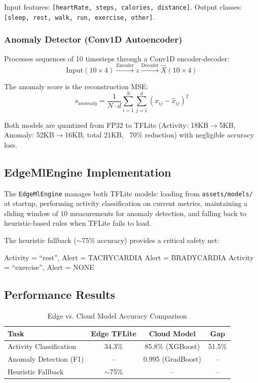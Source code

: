 \documentclass[conference]{IEEEtran}
\begin{document}
Input features: \texttt{[heartRate, steps, calories, distance]}. Output classes: \texttt{[sleep, rest, walk, run, exercise, other]}.

\subsubsection{Anomaly Detector (Conv1D Autoencoder)}
Processes sequences of 10 timesteps through a Conv1D encoder-decoder:
\begin{equation}
\text{Input}(10 \times 4) \xrightarrow{\text{Encoder}} z \xrightarrow{\text{Decoder}} \hat{X}(10 \times 4)
\end{equation}

The anomaly score is the reconstruction MSE:
\begin{equation}
s_{anomaly} = \frac{1}{N \cdot d} \sum_{i=1}^{N} \sum_{j=1}^{d} (x_{ij} - \hat{x}_{ij})^2
\end{equation}

Both models are quantized from FP32 to TFLite (Activity: 18KB$\rightarrow$5KB, Anomaly: 52KB$\rightarrow$16KB, total 21KB, ~70\% reduction) with negligible accuracy loss.

\subsection{EdgeMlEngine Implementation}
The \texttt{EdgeMlEngine} manages both TFLite models: loading from \texttt{assets/models/} at startup, performing activity classification on current metrics, maintaining a sliding window of 10 measurements for anomaly detection, and falling back to heuristic-based rules when TFLite fails to load.

The heuristic fallback ($\sim$75\% accuracy) provides a critical safety net:
\begin{algorithmic}
    \STATE Activity = ``rest'', Alert = TACHYCARDIA
    \STATE Alert = BRADYCARDIA
    \STATE Activity = ``exercise'', Alert = NONE
\ENDIF
\end{algorithmic}

\subsection{Performance Results}

\begin{table}[H]
\centering
\caption{Edge vs. Cloud Model Accuracy Comparison}
\label{tab:edge_vs_cloud}
\begin{tabular}{lccc}
\toprule
\textbf{Task} & \textbf{Edge TFLite} & \textbf{Cloud Model} & \textbf{Gap} \\
\midrule
Activity Classification & 34.3\% & 85.8\% (XGBoost) & 51.5\% \\
Anomaly Detection (F1) & -- & 0.995 (GradBoost) & -- \\
Heuristic Fallback & $\sim$75\% & -- & -- \\
\bottomrule
\end{tabular}
\end{table}
\end{document}
